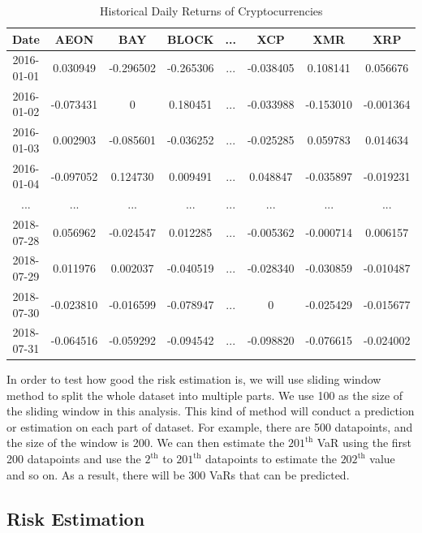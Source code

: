 \documentclass[11pt]{article} %
\theoremstyle{plain}
\theoremstyle{definition}
\begin{document}
{
  \begin{table}[ht]
    \centering
    \scriptsize
    \begin{tabular}{|c|c c c c c c c|}
      \hline
      Date & AEON & BAY & BLOCK & ... & XCP & XMR & XRP \\ [0.5ex]
      \hline
      2016-01-01 & 0.030949 & -0.296502 & -0.265306 & ... & -0.038405 & 0.108141 & 0.056676 \\
      \hline
      2016-01-02 & -0.073431 & 0 & 0.180451 & ... & -0.033988 & -0.153010 & 	-0.001364 \\
      \hline
      2016-01-03 & 0.002903 & -0.085601 & -0.036252 & ... & -0.025285 & 0.059783 & 0.014634 \\
      \hline
      2016-01-04 & -0.097052 & 0.124730 & 0.009491 & ... & 0.048847 & -0.035897 & -0.019231 \\
      \hline
      ... & ... & ... & ... & ... & ... & ... & ... \\
      \hline
      2018-07-28 & 0.056962 & -0.024547 & 0.012285 & ... & -0.005362 & -0.000714 & 0.006157 \\
      \hline
      2018-07-29 & 0.011976 & 0.002037 & -0.040519 & ... & -0.028340 & -0.030859 & -0.010487 \\
      \hline
      2018-07-30 & -0.023810 & -0.016599 & -0.078947 & ... & 0 & -0.025429 & -0.015677 \\
      \hline
      2018-07-31 & -0.064516 & -0.059292 & -0.094542 & ... & -0.098820 & -0.076615 & -0.024002 \\
      \hline
    \end{tabular}
    \caption{Historical Daily Returns of Cryptocurrencies}
    \label{table:drcrypto}
  \end{table}
}

In order to test how good the risk estimation is, we will use sliding window method to split the whole dataset into multiple parts. We use 100 as the size of the sliding window in this analysis. This kind of method will conduct a prediction or estimation on each part of dataset. For example, there are 500 datapoints, and the size of the window is 200. We can then estimate the $201^{\mathrm{th}}$ VaR using the first 200 datapoints and use the $2^{\mathrm{th}}$ to $201^{\mathrm{th}}$ datapoints to estimate the $202^{\mathrm{th}}$ value and so on. As a result, there will be 300 VaRs that can be predicted.

\subsection{Risk Estimation}
\end{document}
